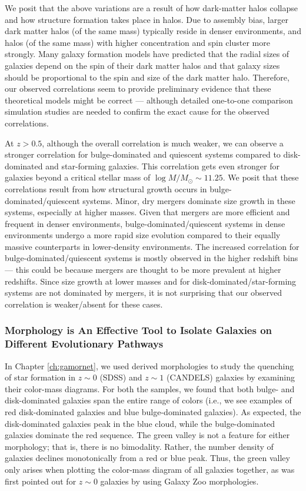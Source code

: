 We posit that the above variations are a result of how dark-matter halos collapse and how structure formation takes place in halos. Due to assembly bias, larger dark matter halos (of the same mass) typically reside in denser environments, and  halos (of the same mass) with higher concentration and spin cluster more strongly. Many galaxy formation models have predicted that the radial sizes of galaxies depend on the spin of their dark matter halos and that galaxy sizes should be proportional to the spin and size of the dark matter halo. Therefore, our observed correlations seem to provide preliminary evidence that these theoretical models might be correct --- although detailed one-to-one comparison simulation studies are needed to confirm the exact cause for the observed correlations.

At $z > 0.5$, although the overall correlation is much weaker, we can observe a stronger correlation for bulge-dominated and quiescent systems compared to disk-dominated and star-forming galaxies. This correlation gets even stronger for galaxies beyond a critical stellar mass of $\log M/M_{\odot} \sim 11.25$. We posit that these correlations result from how structural growth occurs in bulge-dominated/quiescent systems. Minor, dry mergers dominate size growth in these systems, especially at higher masses. Given that mergers are more efficient and frequent in denser environments, bulge-dominated/quiescent systems in dense environments undergo a more rapid size evolution compared to their equally massive counterparts in lower-density environments. The increased correlation for bulge-dominated/quiescent systems is mostly observed in the higher redshift bins --- this could be because mergers are thought to be more prevalent at higher redshifts. Since size growth at lower masses and for disk-dominated/star-forming systems are not dominated by mergers, it is not surprising that our observed correlation is weaker/absent for these cases. 

\subsubsection{Morphology is An Effective Tool to Isolate Galaxies on Different Evolutionary Pathways} \label{sec_conc:color_mass}

In Chapter \ref{ch:gamornet}, we used \gamornet{} derived morphologies to study the quenching of star formation in  $z\sim0$ (SDSS) and $z\sim1$ (CANDELS) galaxies by examining their color-mass diagrams. For both the samples, we found that both bulge- and disk-dominated galaxies span the entire range of colors (i.e., we see examples of red disk-dominated galaxies and blue bulge-dominated galaxies). As expected, the disk-dominated galaxies peak in the blue cloud, while the bulge-dominated galaxies dominate the red sequence. The green valley is not a feature for either morphology; that is, there is no bimodality. Rather, the number density of galaxies declines monotonically from a red or blue peak. Thus, the green valley only arises when plotting the color-mass diagram of all galaxies together, as was first pointed out for $z\sim0$ galaxies by using Galaxy Zoo morphologies. 

